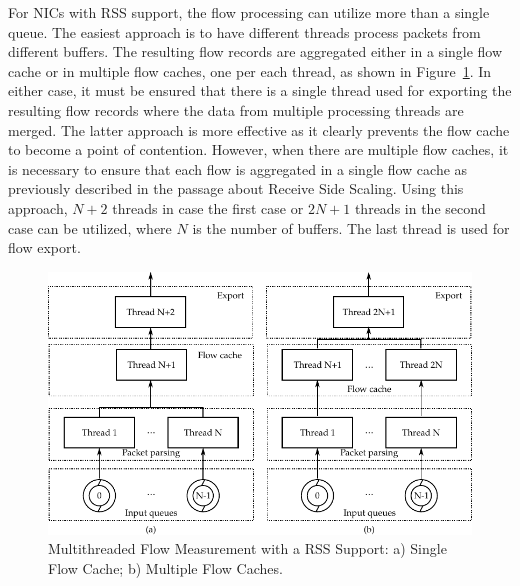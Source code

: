 For NICs with RSS support, the flow processing can utilize more than a single queue. The easiest approach is to have different threads process packets from different buffers. The resulting flow records are aggregated either in a single flow cache or in multiple flow caches, one per each thread, as shown in Figure~\ref{fig:exporter-thread-schema}. In either case, it must be ensured that there is a single thread used for exporting the resulting flow records where the data from multiple processing threads are merged. The latter approach is more effective as it clearly prevents the flow cache to become a point of contention. However, when there are multiple flow caches, it is necessary to ensure that each flow is aggregated in a single flow cache as previously described in the passage about Receive Side Scaling. Using this approach, $N+2$ threads in case the first case or $2N+1$ threads in the second case can be utilized, where $N$ is the number of buffers. The last thread is used for flow export. 

\begin{figure}[t!]
  \begin{center}
    \includegraphics{figures/c05/exporter-thread-schema}
  \end{center}
  \caption{Multithreaded Flow Measurement with a RSS Support: a) Single Flow Cache; b) Multiple Flow Caches.}
  \label{fig:exporter-thread-schema}
\end{figure}

